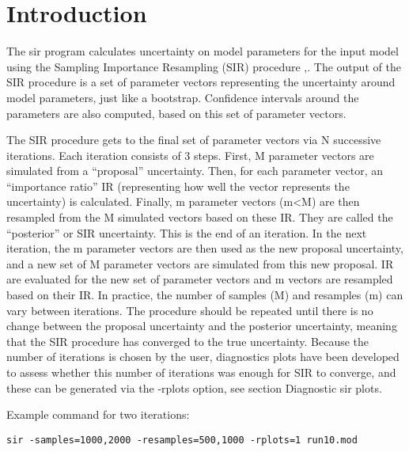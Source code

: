 
\usepackage{amsmath}



\maketitle

\newcommand{\guidetoolname}{sir}


\section{Introduction}
The sir program calculates uncertainty
on model parameters for the input model using the Sampling Importance Resampling (SIR) procedure 
\cite{Dosne2013},\cite{Dosne2015}.
The output of the SIR procedure is a set of parameter vectors representing the uncertainty around 
model parameters, just like a bootstrap. 
Confidence intervals around the parameters are also computed, based on this set of parameter vectors.
 
The SIR procedure gets to the final set of parameter vectors via N successive iterations. 
Each iteration consists of 3 steps. 
First, M parameter vectors are simulated from a “proposal” uncertainty. Then, for each parameter vector, 
an “importance ratio” IR (representing how well the vector represents the uncertainty) is calculated. 
Finally, m parameter vectors (m<M) are then resampled from the M simulated vectors based on these IR.  
They are called the “posterior” or SIR uncertainty. This is the end of an iteration. In the next iteration, 
the m parameter vectors are then used as the new proposal uncertainty, and a new set of M parameter vectors 
are simulated from this new proposal. 
IR are evaluated for the new set of parameter vectors and m vectors are resampled based on their IR. 
In practice, the number of samples (M) and resamples (m) can vary between iterations. The procedure should be 
repeated until there is no change between the proposal uncertainty and the posterior uncertainty, meaning that 
the SIR procedure has converged to the true uncertainty.
Because the number of iterations is chosen by the user, diagnostics plots have been developed to assess whether 
this number of iterations was enough for SIR to converge, and these can be generated via the -rplots option,
see section Diagnostic sir plots.

Example command for two iterations:
\begin{verbatim}
sir -samples=1000,2000 -resamples=500,1000 -rplots=1 run10.mod
\end{verbatim}

